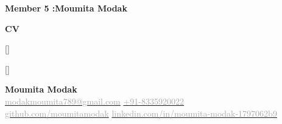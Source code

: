 \documentclass{article}
\begin{document}
\newpage 
\begin{center}
\textbf{\LARGE{{Member 5 :Moumita Modak}}} 
\end{center}

\begin{center}
    \Huge\textbf{CV}
\end{center}   


\renewcommand{\familydefault}{\sfdefault}

\titleformat{\section}{\Large\bfseries\color{headerblue}}{}{0em}{}[\titlerule]
\titleformat{\subsection}{\large\bfseries\color{darkgray}}{}{0em}{}[\vspace{0.5em}\titlerule]

\pagestyle{fancy}
\fancyhf{}
\fancyhead[C]{\textcolor{headerblue}}

\fancyfoot[C]{\thepage}
\renewcommand{\footrulewidth}{0.4pt}
\renewcommand{\headrulewidth}{0.4pt}



\begin{center}
    {\Huge \textbf{\textcolor{headerblue}{Moumita Modak}}}\\
    \vspace{2mm}
    \href{mailto:modakmoumita789@@gmail.com}{\textcolor{darkgray}{\faEnvelope \hspace{1mm} modakmoumita789@gmail.com}} \quad
    \href{tel:+918335920022}{\textcolor{darkgray}{\faPhone \hspace{1mm} +91-8335920022}} \\
    \href{https://github.com/moumitamodak}{\textcolor{darkgray}{\faGithub \hspace{1mm} github.com/moumitamodak}} \quad
    \href{https://www.linkedin.com/in/moumita-modak-1797062b9}{\textcolor{darkgray}{\faLinkedin \hspace{1mm} linkedin.com/in/moumita-modak-1797062b9}} \quad
\end{center}

\vspace{5mm}
\end{document}
